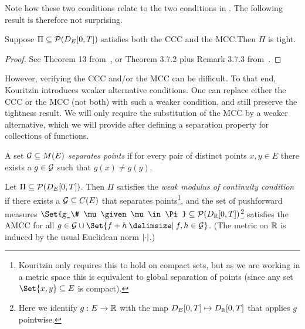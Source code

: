 Note how these two conditions relate to the two conditions in .
The following result is therefore not surprising.

\begin{theorem}
  Suppose \( \Pi \subseteq \mathcal{P}(D_{E}[0,T]) \) satisfies both the CCC and the MCC.\@ Then \( \Pi \) is tight.
\end{theorem}

\begin{proof}
  See Theorem 13 from~\cite{kouritzinTightnessProbabilityMeasures2015}, or Theorem 3.7.2 plus Remark 3.7.3 from~\cite{ethierMarkovProcessesCharacterization1985}.
\end{proof}

However, verifying the CCC and/or the MCC can be difficult.
To that end, Kouritzin introduces weaker alternative conditions.
One can replace either the CCC or the MCC (not both) with such a weaker condition, and still preserve the tightness result.
We will only require the substitution of the MCC by a weaker alternative, which we will provide after defining a separation property for collections of functions.

\begin{definition}
  A set \( \mathcal{G} \subseteq M(E) \) \textit{separates points} if for every pair of distinct points \( x, y \in E \) there exists a \( g \in \mathcal{G} \) such that \( g(x) \neq g(y) \).
\end{definition}

\begin{definition}[WMCC]
  Let \( \Pi \subseteq \mathcal{P}(D_{E}[0,T]) \).
  Then \( \Pi \) satisfies the \textit{weak modulus of continuity condition} if there exists a \( \mathcal{G} \subseteq C(E) \) that separates points\footnote{Kouritzin only requires this to hold on compact sets, but as we are working in a metric space this is equivalent to global separation of points (since any set \( \Set{x,y} \subseteq E \) is compact).}, and the set of pushforward measures \( \Set{g_\# \mu \given \mu \in \Pi} \subseteq \cP(D_\bR[0,T]) \)\footnote{Here we identify \( g : E \to \mathbb{R} \) with the map \( D_E[0,T] \mapsto D_{\mathbb{R}}[0,T] \) that applies \( g \) pointwise.} satisfies the AMCC for all \( g \in \cG \cup \Set{f + h \given f, h \in \cG} \).
  (The metric on \( \mathbb{R} \) is induced by the usual Euclidean norm \( \lvert\cdot\rvert \).)
\end{definition}


